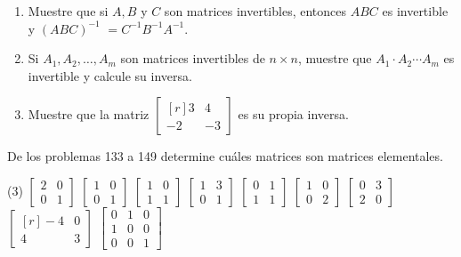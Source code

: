 \begin{enumerate}[start=130]
    \item Muestre que si $A, B$ y $C$ son matrices invertibles, entonces $A B C$ es invertible y $(A B C)^{-1}$ $=C^{-1} B^{-1} A^{-1}$.
    \item Si $A_1, A_2, \dots, A_m$ son matrices invertibles de $n \times n$, muestre que $A_1 \cdot A_2 \cdots A_m$ es invertible y calcule su inversa.
    \item Muestre que la matriz $\begin{bmatrix*}[r]3 & 4 \\ -2 & -3\end{bmatrix*}$ es su propia inversa.
\end{enumerate}
De los problemas 133 a 149 determine cuáles matrices son matrices elementales.
\begin{tasks}[
    start=133,
    style=enumerate,
    label-offset = 4mm,
    ](3)
    \task $\begin{bmatrix*}2 & 0 \\ 0 & 1\end{bmatrix*}$
    \task $\begin{bmatrix*}1 & 0 \\ 0 & 1\end{bmatrix*}$
    \task $\begin{bmatrix*}1 & 0 \\ 1 & 1\end{bmatrix*}$
    \task $\begin{bmatrix*}1 & 3 \\ 0 & 1\end{bmatrix*}$
    \task $\begin{bmatrix*}0 & 1 \\ 1 & 1\end{bmatrix*}$
    \task $\begin{bmatrix*}1 & 0 \\ 0 & 2\end{bmatrix*}$
    \task $\begin{bmatrix*}0 & 3 \\ 2 & 0\end{bmatrix*}$
    \task $\begin{bmatrix*}[r]-4 & 0 \\ 4 & 3\end{bmatrix*}$
    \task $\begin{bmatrix*}0 & 1 & 0 \\ 1 & 0 & 0 \\ 0 & 0 & 1\end{bmatrix*}$

\end{tasks}
